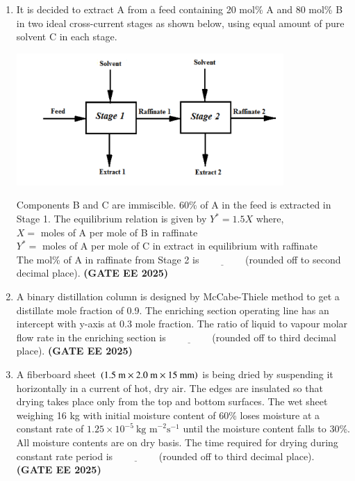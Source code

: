 \documentclass[journal,12pt,onecolumn]{IEEEtran}
\theoremstyle{remark}
\begin{document}
\begin{enumerate}
\item It is decided to extract A from a feed containing 20 mol\% A and 80 mol\% B in two ideal cross-current stages as shown below, using equal amount of pure solvent C in each stage.
\begin{center}
\includegraphics[width=0.8\textwidth]{figs/41.png}
\end{center}
Components B and C are immiscible. 60\% of A in the feed is extracted in Stage 1. The equilibrium relation is given by $Y^{*}=1.5 X$ where, \\
$X=$ moles of A per mole of B in raffinate \\
$Y^{*}=$ moles of A per mole of C in extract in equilibrium with raffinate
\\
The mol\% of A in raffinate from Stage 2 is$\underline{\hspace{2cm}}$(rounded off to second decimal place). \hfill \textbf{(GATE EE 2025)} 



\item A binary distillation column is designed by McCabe-Thiele method to get a distillate mole fraction of 0.9. The enriching section operating line has an intercept with y-axis at 0.3 mole fraction. The ratio of liquid to vapour molar flow rate in the enriching section is$\underline{\hspace{2cm}}$(rounded off to third decimal place). \hfill \textbf{(GATE EE 2025)} 



\item A fiberboard sheet $\left(1.5~\text{m}\times2.0~\text{m}\times15~\text{mm}\right)$ is being dried by suspending it horizontally in a current of hot, dry air. The edges are insulated so that drying takes place only from the top and bottom surfaces. The wet sheet weighing 16 kg with initial moisture content of 60\% loses moisture at a constant rate of $1.25\times10^{-5}~\text{kg m}^{-2}\text{s}^{-1}$ until the moisture content falls to 30\%. All moisture contents are on dry basis. The time required for drying during constant rate period  is$\underline{\hspace{2cm}}$(rounded off to third decimal place). \hfill \textbf{(GATE EE 2025)} 




\end{enumerate}
\end{document}
